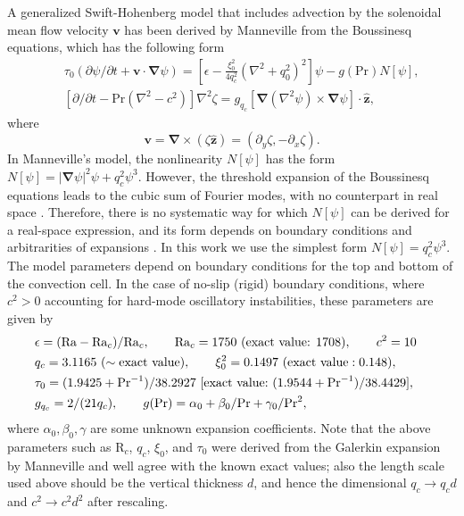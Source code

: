 \documentclass[preprint,prx,floatfix]{revtex4-1}
\begin{document}
A generalized Swift-Hohenberg model that includes advection by the solenoidal mean flow velocity $\mathbf{v}$ has been derived by Manneville \cite{manneville1983two,manneville1984modelisation} from the Boussinesq equations, which has the following form
\begin{eqnarray}
&&\tau_0 \left ( \partial \psi / \partial t + {\bm v} \cdot {\bm
    \nabla} \psi \right )
= \left [ \epsilon - \frac{\xi_0^2}{4q_c^2} \left ( \nabla^2 + q_0^2
\right )^2 \right ] \psi 
-g(\text{Pr}) N[\psi], \label{eq:Manneville}\\
&&\left [ \partial / \partial t - \text{Pr} (\nabla^2 - c^2) \right ] \nabla^2 \zeta
= g_{q_c} \left [ {\bm \nabla}(\nabla^2 \psi) \times {\bm \nabla} \psi
\right ] \cdot \hat{\bm z}, \label{eq:mean_flow_M}
\end{eqnarray}
where
\begin{equation}
{\bm v} = {\bm \nabla} \times (\zeta \hat{\bm z})
= \left ( \partial_y \zeta, -\partial_x \zeta \right ).
\label{eq:U}
\end{equation}
In Manneville's model, the nonlinearity $N[\psi]$ has the form $N[\psi] = |\bm{\nabla}\psi|^2\psi+q_c^2\psi^3$. However, the threshold expansion of the Boussinesq equations leads to the cubic sum of Fourier modes, with no counterpart in real space \cite{cross1980derivation}. Therefore, there is no systematic way for which $N[\psi]$ can be derived for a real-space expression, and its form depends on boundary conditions and arbitrarities of expansions \cite{greenside1985stability}. In this work we use the simplest form $N[\psi] = q_c^2\psi^3$. The model parameters depend on boundary conditions for the top and bottom of the convection cell. In the case of no-slip (rigid) boundary conditions, where $c^2 > 0$ accounting for hard-mode oscillatory instabilities, these parameters are given by \cite{manneville1984modelisation}
\begin{eqnarray}
&\epsilon = (\text{Ra}-\text{Ra}_c)/\text{Ra}_c, \qquad \text{Ra}_c=1750 ~\textrm{(exact value: 1708)}, \qquad c^2=10& \nonumber\\
&q_c=3.1165 ~(\sim \text{exact value}), \qquad \xi_0^2=0.1497
~{\rm (exact ~value: 0.148)},& \nonumber\\
&\tau_0=(1.9425+{\textrm{Pr}}^{-1})/38.2927 ~\text{[exact value:}
~(1.9544+{\text{Pr}}^{-1})/38.4429],& \nonumber\\
&g_{q_c}=2/(21q_c), \qquad g(\text{Pr})=\alpha_0 + \beta_0/\text{Pr} +
\gamma_0/{\textrm{Pr}}^2,& \label{eq:values}
\end{eqnarray}
where $\alpha_0, \beta_0, \gamma$ are some unknown expansion coefficients. Note that the above parameters such as $\text{R}_c$, $q_c$, $\xi_0$, and $\tau_0$ were derived from the  Galerkin expansion by Manneville \cite{manneville1983two,manneville1984modelisation} and well agree with the known exact values; also the length scale used above should be the vertical thickness $d$, and hence the dimensional $q_c \rightarrow q_cd$ and $c^2 \rightarrow c^2 d^2$ after rescaling.
\end{document}

